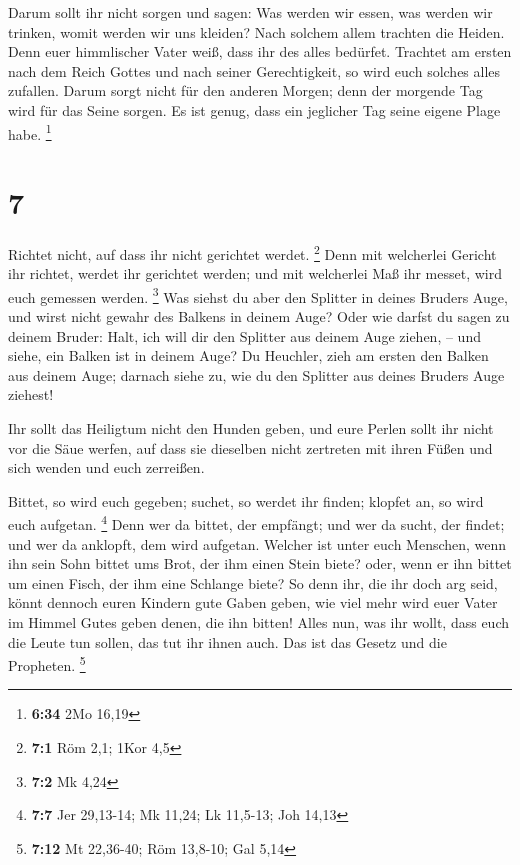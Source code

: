  Darum sollt ihr nicht sorgen und sagen: Was werden wir
essen, was werden wir trinken, womit werden wir uns kleiden?
 Nach solchem allem trachten die Heiden. Denn euer
himmlischer Vater weiß, dass ihr des alles bedürfet. 
Trachtet am ersten nach dem Reich Gottes und nach seiner Gerechtigkeit,
so wird euch solches alles zufallen.  Darum sorgt nicht für
den anderen Morgen; denn der morgende Tag wird für das Seine sorgen. Es
ist genug, dass ein jeglicher Tag seine eigene Plage habe. \footnote{\textbf{6:34}
  2Mo 16,19}

\hypertarget{section-5}{%
\section{7}\label{section-5}}

 Richtet nicht, auf dass ihr nicht gerichtet werdet.
\footnote{\textbf{7:1} Röm 2,1; 1Kor 4,5}  Denn mit
welcherlei Gericht ihr richtet, werdet ihr gerichtet werden; und mit
welcherlei Maß ihr messet, wird euch gemessen werden. \footnote{\textbf{7:2}
  Mk 4,24}  Was siehst du aber den Splitter in deines
Bruders Auge, und wirst nicht gewahr des Balkens in deinem Auge?
 Oder wie darfst du sagen zu deinem Bruder: Halt, ich will
dir den Splitter aus deinem Auge ziehen, -- und siehe, ein Balken ist in
deinem Auge?  Du Heuchler, zieh am ersten den Balken aus
deinem Auge; darnach siehe zu, wie du den Splitter aus deines Bruders
Auge ziehest!

 Ihr sollt das Heiligtum nicht den Hunden geben, und eure
Perlen sollt ihr nicht vor die Säue werfen, auf dass sie dieselben nicht
zertreten mit ihren Füßen und sich wenden und euch zerreißen.

 Bittet, so wird euch gegeben; suchet, so werdet ihr finden;
klopfet an, so wird euch aufgetan. \footnote{\textbf{7:7} Jer 29,13-14;
  Mk 11,24; Lk 11,5-13; Joh 14,13}  Denn wer da bittet, der
empfängt; und wer da sucht, der findet; und wer da anklopft, dem wird
aufgetan.  Welcher ist unter euch Menschen, wenn ihn sein
Sohn bittet ums Brot, der ihm einen Stein biete?  oder,
wenn er ihn bittet um einen Fisch, der ihm eine Schlange biete?
 So denn ihr, die ihr doch arg seid, könnt dennoch euren
Kindern gute Gaben geben, wie viel mehr wird euer Vater im Himmel Gutes
geben denen, die ihn bitten!  Alles nun, was ihr wollt,
dass euch die Leute tun sollen, das tut ihr ihnen auch. Das ist das
Gesetz und die Propheten. \footnote{\textbf{7:12} Mt 22,36-40; Röm
  13,8-10; Gal 5,14}

